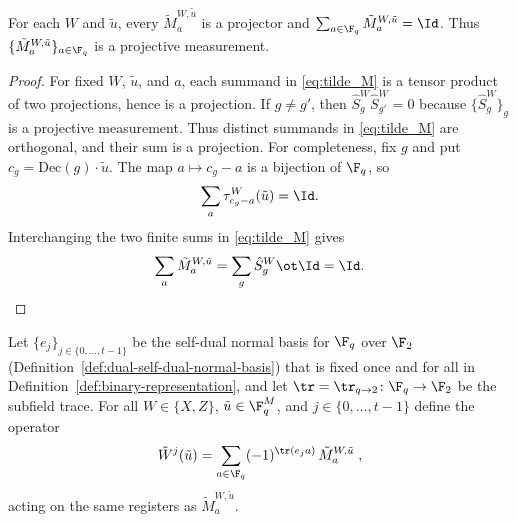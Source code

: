 \begin{lemma}\label{lem:tilde-m-projective}
	\leanok
	For each $W$ and $\tilde{u}$, every $\tilde{M}^{W,\tilde{u}}_a$ is a projector and
	$\sum_{a\in\F_q}\tilde{M}^{W,\tilde{u}}_a=\Id$. Thus
	$\{\tilde{M}^{W,\tilde{u}}_a\}_{a\in\F_q}$ is a projective measurement.
\end{lemma}

\begin{proof}
	\leanok
	For fixed $W$, $\tilde{u}$, and $a$, each summand in \eqref{eq:tilde_M}
	is a tensor product of two projections, hence is a projection.
	If $g\ne g'$, then $\hat{S}^W_g\hat{S}^W_{g'}=0$ because
	$\{\hat{S}^W_g\}_g$ is a projective measurement. Thus distinct summands
	in \eqref{eq:tilde_M} are orthogonal, and their sum is a projection.
	For completeness, fix $g$ and put $c_g=\mathrm{Dec}(g)\cdot\tilde{u}$.
	The map $a\mapsto c_g-a$ is a bijection of $\F_q$, so
	\[
		\sum_a\tau^W_{c_g-a}(\tilde{u})=\Id.
	\]
	Interchanging the two finite sums in \eqref{eq:tilde_M} gives
	\[
		\sum_a\tilde{M}^{W,\tilde{u}}_a
		=\sum_g\hat{S}^W_g\ot\Id=\Id.
	\]
\end{proof}

\begin{definition}\label{def:tilde-w-observables}
	\leanok
	Let $\{e_j\}_{j \in \{0,\ldots,t-1\}}$ be the self-dual normal basis for $\F_q$ over $\F_2$ (Definition~\ref{def:dual-self-dual-normal-basis}) that is fixed once and for all in Definition~\ref{def:binary-representation}, and let $\tr = \tr_{q \to 2} \colon \F_q \to \F_2$ be the subfield trace. For all $W \in \{X,Z\}$, $\tilde{u} \in \F_q^M$, and $j \in \{0,\ldots,t-1\}$ define the operator
	\begin{equation}\label{eq:def-tildewj}
		\tilde{W}^j(\tilde{u}) = \sum_{a \in \F_q} (-1)^{\tr(e_j a)} \, \tilde{M}_a^{W,\tilde{u}}\;,
	\end{equation}
	acting on the same registers as $\tilde{M}^{W,\tilde{u}}_a$.
\end{definition}

